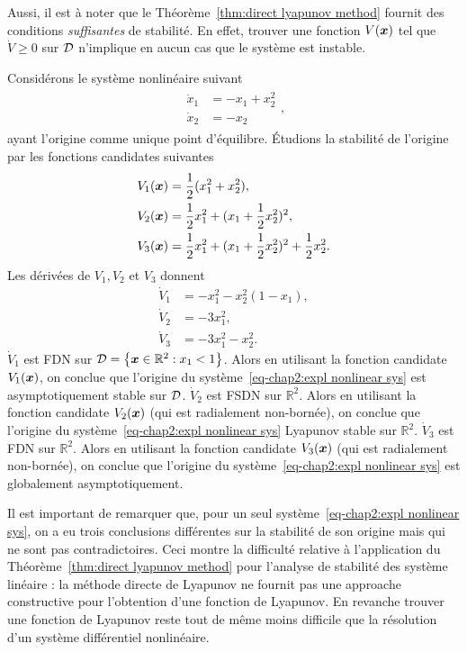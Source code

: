 Aussi, il est à noter que le Théorème~\ref{thm:direct lyapunov method} fournit des conditions \emph{suffisantes} de stabilité. En effet, trouver une fonction $V(\bm{x})$ tel que $\dot{V}\geq0$ sur ${\cal D}$ n'implique en aucun cas que le système est instable. 
\begin{example}
	Considérons le système nonlinéaire suivant 
	\begin{align}\label{eq-chap2:expl nonlinear sys}
		\begin{split}
			\dot{x}_1 &=-x_1 + x_2^2\\
			\dot{x}_2 &=-x_2
		\end{split},
	\end{align}
	ayant l'origine comme unique point d'équilibre. Étudions la stabilité de l'origine par les fonctions candidates suivantes 
	\begin{align}		
			\label{eq-chap2:V1}	V_1(\bm{x})&= \frac{1}{2}(x_1^2 + x_2^2),\\
			\label{eq-chap2:V2}	V_2(\bm{x})&= \frac{1}{2} x_1^2 + (x_1+\frac{1}{2} x_2^2)^2,\\
		\label{eq-chap2:V3}		V_3(\bm{x})&= \frac{1}{2} x_1^2 + (x_1+\frac{1}{2} x_2^2)^2 + \frac{1}{2} x_2^2	.	
	\end{align}
	Les dérivées de $V_1,V_2$ et $V_3$ donnent
	\begin{align}\label{eq-chap2:Vdot1}		
		\dot{V}_1&= -x_1^2 - x_2^2(1-x_1),\\
		\label{eq-chap2:Vdot2}	\dot{V}_2&= -3x_1^2,\\
	\label{eq-chap2:Vdot3}		\dot{V}_3&= -3x_1^2 -x_2^2	.	
	\end{align}
	$\dot{V}_1$ est FDN sur ${\cal D} = \left\{\bm{x}\in \mathbb{R}^2: x_1<1\right\}$. Alors en utilisant la fonction candidate $V_1(\bm{x})$, on conclue que l'origine du système~\eqref{eq-chap2:expl nonlinear sys} est asymptotiquement stable sur ${\cal D}$. 
	$\dot{V}_2$ est FSDN sur $\mathbb{R}^2$. Alors en utilisant la fonction candidate $V_2(\bm{x})$ (qui est radialement non-bornée), on conclue que l'origine du système~\eqref{eq-chap2:expl nonlinear sys} Lyapunov stable sur $\mathbb{R}^2$. 
	$\dot{V}_3$ est FDN sur $\mathbb{R}^2$. Alors en utilisant la fonction candidate $V_3(\bm{x})$ (qui est radialement non-bornée), on conclue que l'origine du système~\eqref{eq-chap2:expl nonlinear sys} est globalement asymptotiquement. 
\end{example}
Il est important de remarquer que, pour un seul système~\eqref{eq-chap2:expl nonlinear sys}, on a eu trois conclusions différentes  sur la stabilité de son origine mais qui ne sont pas contradictoires. Ceci montre la difficulté relative à l'application du Théorème~\ref{thm:direct lyapunov method} pour l'analyse de stabilité des système linéaire : la méthode directe de Lyapunov ne fournit pas une approache constructive pour l'obtention d'une fonction de Lyapunov. En revanche trouver une fonction de Lyapunov reste tout de même moins difficile que la résolution d'un système différentiel nonlinéaire.
